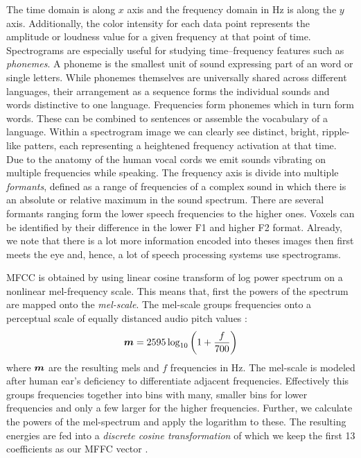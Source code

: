 The time domain is along $x$ axis and the frequency domain in Hz is along the $y$ axis. Additionally, the color intensity for each data point represents the amplitude or loudness value for a given frequency at that point of time. Spectrograms are especially useful for studying time--frequency features such as \emph{phonemes}. A phoneme is the smallest unit of sound expressing part of an word or single letters. While phonemes themselves are universally shared across different languages, their arrangement as a sequence forms the individual sounds and words distinctive to one language. Frequencies form phonemes which in turn form words. These can be combined to sentences or assemble the vocabulary of a language.
Within a spectrogram image we can clearly see distinct, bright, ripple-like patters, each representing a heightened frequency activation at that time. Due to the anatomy of the human vocal cords we emit sounds vibrating on multiple frequencies while speaking. 
The frequency axis is divide into multiple \emph{formants}, defined as a range of frequencies of a complex sound in which there is an absolute or relative maximum in the sound spectrum. There are several formants ranging form the lower speech frequencies to the higher ones. Voxels can be identified by their difference in the lower F1 and higher F2 format. Already, we note that there is a lot more information encoded into theses images then first meets the eye and, hence, a lot of speech processing systems use spectrograms.

MFCC is obtained by using linear cosine transform of log power spectrum on a nonlinear mel-frequency scale. This means that, first the powers of the spectrum are mapped onto the \emph{mel-scale}. The mel-scale groups frequencies onto a perceptual scale of equally distanced audio pitch values \cite{stevens1937scale}: 
$$
\boldsymbol{m} = 2595 \log_{10}\left(1+{\frac {f}{700}}\right)
$$
where $\boldsymbol{m}$ are the resulting mels and $f$ frequencies in Hz. The mel-scale is modeled after human ear's deficiency to differentiate adjacent frequencies. Effectively this groups frequencies together into bins with many, smaller bins for lower frequencies and only a few larger for the higher frequencies. Further, we calculate the powers of the mel-spectrum and apply the logarithm to these. The resulting energies are fed into a \emph{discrete cosine transformation} of which we keep the first 13 coefficients as our MFFC vector \cite{sahidullah2012design}. 
